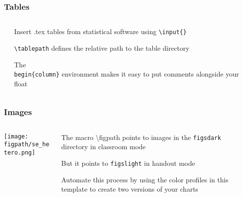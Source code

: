 \documentclass[aspectratio=169,handout]{beamer}
\begin{document}
\begin{frame}
	\frametitle{Tables}
	\begin{columns}[T] %
	\begin{column}{.48\textwidth}
		
	\end{column}%
	\hfill%
	\begin{column}{.48\textwidth}
		\begin{witem}
		\item Insert .tex tables from statistical software
			using \texttt{\textbackslash{}input\{\}}
		\item \texttt{\textbackslash{}tablepath} defines the relative path to
			the table directory
		\item The \texttt{\\begin\{column\}} environment
			makes it easy to put comments alongside your float
	\end{witem}
	\end{column}%
	\end{columns}
\end{frame}


\begin{frame}
	\frametitle{Images}
	\begin{columns}[T] %
	\begin{column}{.48\textwidth}
		\texttt{[image: \\figpath/se\_hetero.png]}
	\end{column}%
	\hfill%
	\begin{column}{.48\textwidth}
		\begin{witem}
		\item The macro {\textbackslash{}figpath} points to images in the
			\texttt{figs\textunderscore{}dark} directory in classroom mode
		\item But it points to \texttt{figs\textunderscore{}light} in handout mode
		\item Automate this process by using the color profiles in this template
			to create two versions of your charts
	\end{witem}
	\end{column}%
	\end{columns}
\end{frame}
\end{document}
